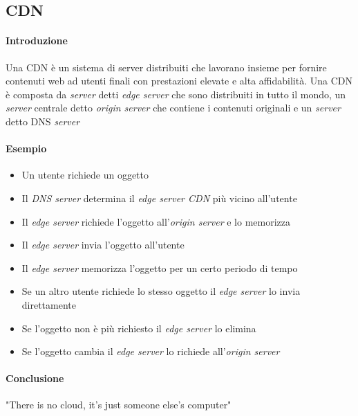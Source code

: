     \subsection[Content Delivery Network (\texttt{CND})]{\acrfull*{CDN}}
        \paragraph{Introduzione} Una \Acrshort*{CDN} è un sistema di server distribuiti che lavorano insieme per fornire contenuti web ad utenti finali con prestazioni elevate e alta affidabilità. Una \Acrshort*{CDN} è composta da \textit{server} detti \textit{edge server} che sono distribuiti in tutto il mondo, un \textit{server} centrale detto \textit{origin server} che contiene i contenuti originali e un \textit{server} detto \Acrshort*{DNS} \textit{server}
        \paragraph{Esempio} 
            \begin{itemize}
                \item Un utente richiede un oggetto
                \item Il \textit{\Acrshort*{DNS} server} determina il \textit{edge server \Acrshort*{CDN}} più vicino all'utente
                \item Il \textit{edge server} richiede l'oggetto all'\textit{origin server} e lo memorizza
                \item Il \textit{edge server} invia l'oggetto all'utente
                \item Il \textit{edge server} memorizza l'oggetto per un certo periodo di tempo
                \item Se un altro utente richiede lo stesso oggetto il \textit{edge server} lo invia direttamente
                \item Se l'oggetto non è più richiesto il \textit{edge server} lo elimina
                \item Se l'oggetto cambia il \textit{edge server} lo richiede all'\textit{origin server}
            \end{itemize}
    
    \paragraph{Conclusione} "There is no cloud, it's just someone else's computer"